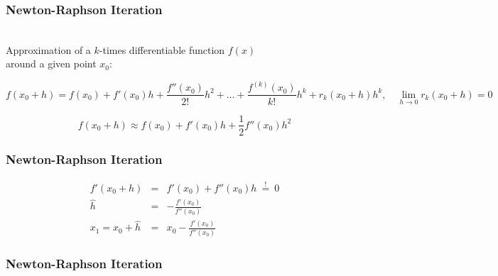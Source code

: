 \begin{frame}
  \frametitle{Newton-Raphson Iteration}

  \\[.3cm]
   
  Approximation of a $k$-times differentiable function $f(x)$ \\
  around a given point $x_0$:
 
  {\small
  \begin{displaymath}
    f(x_0+h) = f(x_0) + f'(x_0) h + \frac{f''(x_0)}{2!} h^2 + \ldots +
           \frac{f^{(k)}(x_0)}{k!} h^k + r_k(x_0 + h) h^k, 
           \quad \lim_{h \rightarrow 0} r_k(x_0 + h) = 0
  \end{displaymath}
  }
  \pspread

  \begin{displaymath}
    f(x_0 + h) \approx f(x_0) + f'(x_0) h + \frac{1}{2} f''(x_0) h^2
  \end{displaymath}
\end{frame}
  

\begin{frame}
  \frametitle{Newton-Raphson Iteration \cont}


  \begin{eqnarray*}
    f'(x_0 + h)         & = & f'(x_0) + f''(x_0) h ~\stackrel{!}{=}~ 0 \\[.3cm]
                \hat{h} & = & - \frac{f'(x_0)}{f''(x_0)} \\[.3cm]
    x_1 = x_0 + \hat{h} & = & x_0 - \frac{f'(x_0)}{f''(x_0)} 
  \end{eqnarray*}
\end{frame}


\begin{frame}
  \frametitle{Newton-Raphson Iteration \cont}

  \begin{center}
  \end{center}
\end{frame}


